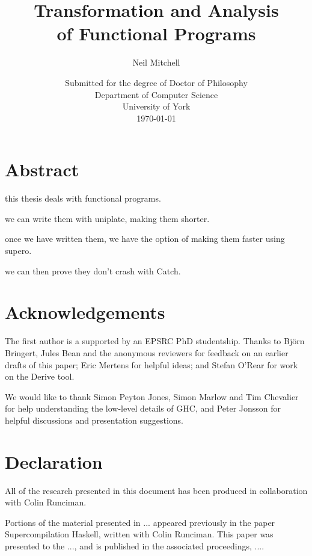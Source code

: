
\title{Transformation and Analysis \\ of Functional Programs}
\author{Neil Mitchell}
\date{\normalsize{
    \vspace{20mm}
    Submitted for the degree of Doctor of Philosophy \\
    \vspace{10mm}
    Department of Computer Science \\
    University of York \\
    \today}}

\maketitle

\setcounter{page}{2}

\chapter*{Abstract}
this thesis deals with functional programs.

we can write them with uniplate, making them shorter.

once we have written them, we have the option of making them faster using supero.

we can then prove they don't crash with Catch.

\tableofcontents
\listoffigures
\listoftables

\chapter*{Acknowledgements}


The first author is a supported by an EPSRC PhD studentship. Thanks to Bj\"{o}rn Bringert, Jules Bean and the anonymous reviewers for feedback on an earlier drafts of this paper; Eric Mertens for helpful ideas; and Stefan O'Rear for work on the Derive tool.

We would like to thank Simon Peyton Jones, Simon Marlow and Tim Chevalier for help understanding the low-level details of GHC, and Peter Jonsson for helpful discussions and presentation suggestions.


\chapter*{Declaration}

All of the research presented in this document has been produced in collaboration with Colin Runciman.

Portions of the material presented in ... appeared previously in the paper Supercompilation Haskell, written with Colin Runciman. This paper was presented to the ..., and is published in the associated proceedings, ....

